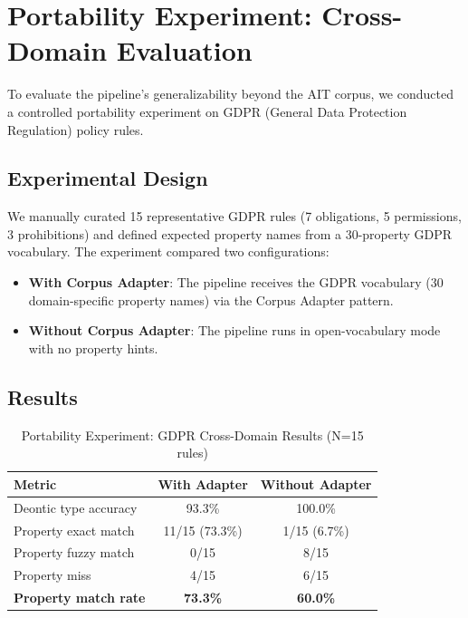 \section{Portability Experiment: Cross-Domain Evaluation}
\label{sec:portability-experiment}

To evaluate the pipeline's generalizability beyond the AIT corpus, we conducted a controlled portability experiment on GDPR (General Data Protection Regulation) policy rules.

\subsection{Experimental Design}

We manually curated 15 representative GDPR rules (7 obligations, 5 permissions, 3 prohibitions) and defined expected property names from a 30-property GDPR vocabulary. The experiment compared two configurations:

\begin{itemize}
    \item \textbf{With Corpus Adapter}: The pipeline receives the GDPR vocabulary (30 domain-specific property names) via the Corpus Adapter pattern.
    \item \textbf{Without Corpus Adapter}: The pipeline runs in open-vocabulary mode with no property hints.
\end{itemize}

\subsection{Results}

\begin{table}[htbp]
\centering
\caption{Portability Experiment: GDPR Cross-Domain Results (N=15 rules)}
\label{tab:portability}
\begin{tabular}{lcc}
\toprule
\textbf{Metric} & \textbf{With Adapter} & \textbf{Without Adapter} \\
\midrule
Deontic type accuracy & 93.3\% & 100.0\% \\
Property exact match & 11/15 (73.3\%) & 1/15 (6.7\%) \\
Property fuzzy match & 0/15 & 8/15 \\
Property miss & 4/15 & 6/15 \\
\textbf{Property match rate} & \textbf{73.3\%} & \textbf{60.0\%} \\
\bottomrule
\end{tabular}
\end{table}

